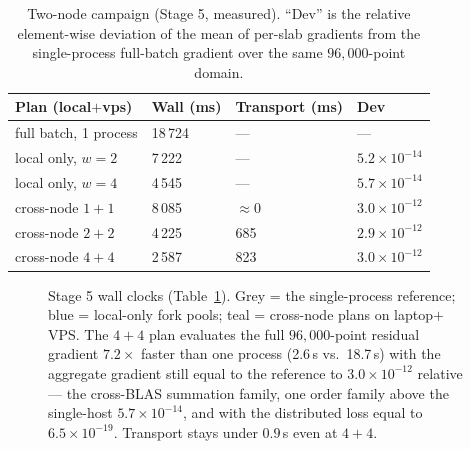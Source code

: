 \documentclass[11pt,a4paper]{article}
\theoremstyle{plain}
\theoremstyle{definition}
\begin{document}
\begin{table}[h]
\centering
\caption{Two-node campaign (Stage 5, measured). ``Dev'' is the relative
element-wise deviation of the mean of per-slab gradients from the
single-process full-batch gradient over the same $96{,}000$-point domain.}
\label{tab:twonode}
\begin{tabular}{llll}
\toprule
\textbf{Plan (local$+$vps)} & \textbf{Wall (ms)} & \textbf{Transport (ms)} & \textbf{Dev} \\
\midrule
full batch, 1 process & 18\,724 & --- & --- \\
local only, $w{=}2$   &  7\,222 & --- & $5.2\times10^{-14}$ \\
local only, $w{=}4$   &  4\,545 & --- & $5.7\times10^{-14}$ \\
cross-node $1{+}1$    &  8\,085 & $\approx 0$ & $3.0\times10^{-12}$ \\
cross-node $2{+}2$    &  4\,225 & 685 & $2.9\times10^{-12}$ \\
cross-node $4{+}4$    &  2\,587 & 823 & $3.0\times10^{-12}$ \\
\bottomrule
\end{tabular}
\end{table}

\begin{figure}[h]
\centering
{}
\caption{Stage 5 wall clocks (Table~\protect\ref{tab:twonode}). Grey = the
single-process reference; blue = local-only fork pools; teal = cross-node
plans on laptop$+$VPS. The $4{+}4$ plan evaluates the full
$96{,}000$-point residual gradient $7.2\times$ faster than one process
(2.6\,s vs.\ 18.7\,s) with the aggregate gradient still equal to the
reference to $3.0\times10^{-12}$ relative --- the cross-BLAS summation
family, one order family above the single-host $5.7\times10^{-14}$, and
with the distributed loss equal to $6.5\times10^{-19}$. Transport stays
under $0.9$\,s even at $4{+}4$.}
\label{fig:twonode}
\end{figure}
\end{document}
